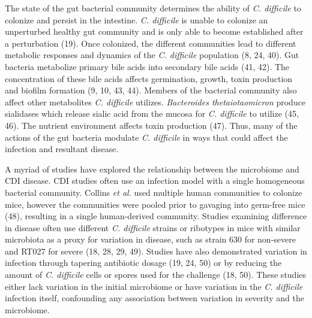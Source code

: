 \documentclass[
  12pt,
]{article}
\begin{document}
The state of the gut bacterial community determines the ability of
\emph{C. difficile} to colonize and persist in the intestine. \emph{C.
difficile} is unable to colonize an unperturbed healthy gut community
and is only able to become established after a perturbation (19). Once
colonized, the different communities lead to different metabolic
responses and dynamics of the \emph{C. difficile} population (8, 24,
40). Gut bacteria metabolize primary bile acids into secondary bile
acids (41, 42). The concentration of these bile acids affects
germination, growth, toxin production and biofilm formation (9, 10, 43,
44). Members of the bacterial community also affect other metabolites
\emph{C. difficile} utilizes. \emph{Bacteroides thetaiotaomicron}
produce sialidases which release sialic acid from the mucosa for
\emph{C. difficile} to utilize (45, 46). The nutrient environment
affects toxin production (47). Thus, many of the actions of the gut
bacteria modulate \emph{C. difficile} in ways that could affect the
infection and resultant disease.

A myriad of studies have explored the relationship between the
microbiome and CDI disease. CDI studies often use an infection model
with a single homogeneous bacterial community. Collins \emph{et al.}
used multiple human communities to colonize mice, however the
communities were pooled prior to gavaging into germ-free mice (48),
resulting in a single human-derived community. Studies examining
difference in disease often use different \emph{C. difficile} strains or
ribotypes in mice with similar microbiota as a proxy for variation in
disease, such as strain 630 for non-severe and RT027 for severe (18, 28,
29, 49). Studies have also demonstrated variation in infection through
tapering antibiotic dosage (19, 24, 50) or by reducing the amount of
\emph{C. difficile} cells or spores used for the challenge (18, 50).
These studies either lack variation in the initial microbiome or have
variation in the \emph{C. difficile} infection itself, confounding any
association between variation in severity and the microbiome.
\end{document}
